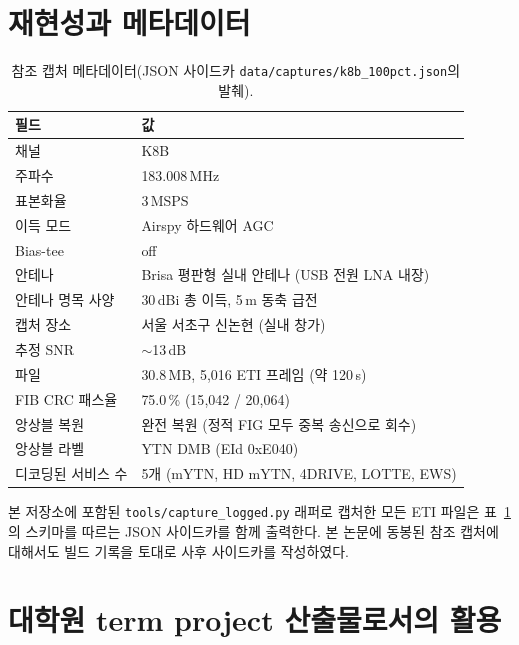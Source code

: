 \documentclass[11pt,a4paper]{article}
\begin{document}
\section{재현성과 메타데이터}\label{sec:reproducibility}

\begin{table}[t]
\centering
\caption{참조 캡처 메타데이터(JSON 사이드카
\texttt{data/captures/k8b\_100pct.json}의 발췌).}
\label{tab:capture-meta}
\begin{tabular}{ll}
\toprule
필드 & 값 \\
\midrule
채널                  & K8B \\
주파수                & 183.008\,MHz \\
표본화율              & 3\,MSPS \\
이득 모드             & Airspy 하드웨어 AGC \\
Bias-tee              & off \\
안테나                & Brisa 평판형 실내 안테나 (USB 전원 LNA 내장) \\
안테나 명목 사양      & 30\,dBi 총 이득, 5\,m 동축 급전 \\
캡처 장소             & 서울 서초구 신논현 (실내 창가) \\
추정 SNR              & $\sim$13\,dB \\
파일                  & 30.8\,MB, 5{,}016 ETI 프레임 (약 120\,s) \\
FIB CRC 패스율        & 75.0\,\% (15{,}042 / 20{,}064) \\
앙상블 복원           & 완전 복원 (정적 FIG 모두 중복 송신으로 회수) \\
앙상블 라벨           & YTN DMB (EId 0xE040) \\
디코딩된 서비스 수    & 5개 (mYTN, HD mYTN, 4DRIVE, LOTTE, EWS) \\
\bottomrule
\end{tabular}
\end{table}

본 저장소에 포함된 \texttt{tools/capture\_logged.py} 래퍼로 캡처한 모든
ETI 파일은 표~\ref{tab:capture-meta}의 스키마를 따르는 JSON 사이드카를
함께 출력한다.  본 논문에 동봉된 참조 캡처에 대해서도 빌드 기록을 토대로
사후 사이드카를 작성하였다.

\section{대학원 term project 산출물로서의 활용}\label{sec:education}
\end{document}
